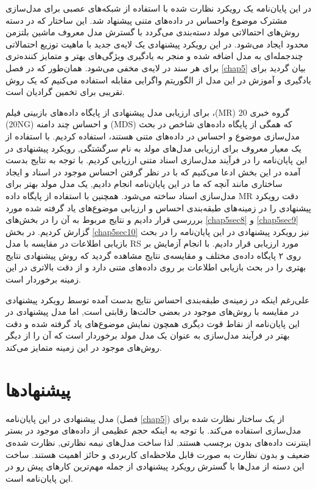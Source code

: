 در این پایان‌‌نامه یک رویکرد نظارت شده با استفاده از شبکه‌های عصبی برای مدل‌سازی مشترک موضوع واحساس در داده‌های متنی پیشنهاد شد. این ساختار که در دسته روش‌های احتمالاتی مولد دسته‌بندی می‌گردد با گسترش مدل معروف ماشین بلتزمن محدود ایجاد می‌شود. در این رویکرد پیشنهادی یک لایه‌ی جدید با ماهیت توزیع احتمالاتی چندجمله‌ای به مدل اضافه شده و منجر به یادگیری ویژگی‌های بهتر و متمایز کننده‌تری برای هر سند در لایه‌ی مخفی
می‌شود. همان‌طور که در فصل 
\ref{chap5}
بیان گردید برای یادگیری و آموزش در این مدل از الگوریتم واگرایی مقابله استفاده می‌کنیم که یک روش تقریبی برای تخمین گرادیان است.

برای ارزیابی مدل پیشنهادی از پایگاه داده‌های بازبینی فیلم
،(MR)
 20 گروه خبری 
(20NG)
 و احساس چند دامنه 
(MDS)
 که همگی از پایگاه داده‌های شاخص در بحث مدل‌سازی موضوع و احساس  در داده‌های متنی هستند، استفاده کردیم. با استفاده از یک معيار معروف برای ارزیابی مدل‌های مولد به نام سرگشتگی, رویکرد پیشنهادی در این پایان‌‌نامه را در فرآیند مدل‌سازی اسناد متنی ارزیابی کردیم. با توجه به نتایج بدست آمده در این بخش ادعا می‌کنیم که با در نظر گرفتن احساس موجود در اسناد و ایجاد ساختاری مانند آنچه که ما در این پایان‌‌نامه انجام دادیم, یک مدل مولد بهتر برای مدل‌سازی اسناد ساخته می‌شود. همچنین با استفاده از پایگاه داده 
MR
 دقت رویکرد پیشنهادی را در زمینه‌های طبقه‌بندی احساس و ارزیابی موضوع‌های یاد گرفته شده مورد برررسی قرار دادیم و نتایج مربوط به آن را در بخش‌های
\ref{chap5sec8}
و
\ref{chap5sec9}
گزارش کردیم. در بخش
\ref{chap5sec10}
نیز رویکرد پیشنهادی در این پایان‌‌نامه را در بحث بازیابی اطلاعات در مقایسه با مدل
RS
مورد ارزیابی قرار دادیم. با انجام آزمایش بر روی ۲ پایگاه داده‌‌ی مختلف و مقایسه‌ی نتایج مشاهده گردید که روش پیشنهادی نتایج بهتری را در بحث بازیابی اطلاعات بر روی داده‌های متنی دارد و از دقت بالاتری در این زمینه برخوردار است.

علی‌رغم اینکه در زمینه‌ی طبقه‌بندی احساس نتایج بدست آمده توسط رویکرد پیشنهادی در مقایسه با روش‌های موجود در بعضی حالت‌ها رقابتی است, اما مدل پیشنهادی در این پایان‌‌نامه از نقاط قوت دیگری همچون نمایش موضوع‌های یاد گرفته شده و دقت بهتر در فرآیند مدل‌سازی به عنوان یک مدل مولد برخوردار است که آن را از دیگر روش‌های موجود در این زمینه متمایز می‌کند.


\section{پیشنهاد‌ها}
مدل پیشنهادی در این پایان‌‌نامه
(فصل 
\ref{chap5})
از یک ساختار نظارت شده برای مدل‌سازی استفاده می‌کند. با توجه به اینکه حجم عظیمی از داده‌های موجود در بستر اینترنت داده‌های بدون برچسب هستند, لذا ساخت مدل‌های نیمه نظارتی, نظارت شده‌ی ضعیف و بدون نظارت به صورت قابل ملاحظه‌ای کاربردی و حائز اهمیت هستند. ساخت این دسته از مدل‌ها با گسترش رویکرد پیشنهادی از جمله مهم‌ترین کارهای پیش‌ رو در این پایان‌نامه است. 

